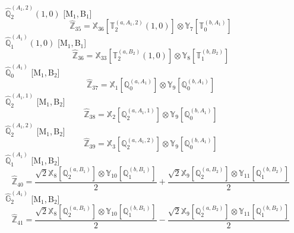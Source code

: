 \documentclass[fleqn,10pt,landscape]{article}
\begin{document}
\begin{itemize}
\begin{dmath*}
\end{dmath*}
\vspace{4mm}
\noindent {} $\,\,\,\hat{\mathbb{Q}}_{2}^{(A_{1},2)}(1,0)$ [M$_{1}$,\,B$_{1}$]
\begin{dmath*}
\hat{\mathbb{Z}}_{35}=\mathbb{X}_{36}[\mathbb{T}_{2}^{(a,A_{1},2)}(1,0)] \otimes\mathbb{Y}_{7}[\mathbb{T}_{0}^{(b,A_{1})}]
\end{dmath*}
\vspace{4mm}
\noindent {} $\,\,\,\hat{\mathbb{Q}}_{1}^{(A_{1})}(1,0)$ [M$_{1}$,\,B$_{1}$]
\begin{dmath*}
\hat{\mathbb{Z}}_{36}=\mathbb{X}_{33}[\mathbb{T}_{2}^{(a,B_{2})}(1,0)] \otimes\mathbb{Y}_{8}[\mathbb{T}_{1}^{(b,B_{2})}]
\end{dmath*}
\vspace{4mm}
\noindent {} $\,\,\,\hat{\mathbb{Q}}_{0}^{(A_{1})}$ [M$_{1}$,\,B$_{2}$]
\begin{dmath*}
\hat{\mathbb{Z}}_{37}=\mathbb{X}_{1}[\mathbb{Q}_{0}^{(a,A_{1})}] \otimes\mathbb{Y}_{9}[\mathbb{Q}_{0}^{(b,A_{1})}]
\end{dmath*}
\vspace{4mm}
\noindent {} $\,\,\,\hat{\mathbb{Q}}_{2}^{(A_{1},1)}$ [M$_{1}$,\,B$_{2}$]
\begin{dmath*}
\hat{\mathbb{Z}}_{38}=\mathbb{X}_{2}[\mathbb{Q}_{2}^{(a,A_{1},1)}] \otimes\mathbb{Y}_{9}[\mathbb{Q}_{0}^{(b,A_{1})}]
\end{dmath*}
\vspace{4mm}
\noindent {} $\,\,\,\hat{\mathbb{Q}}_{2}^{(A_{1},2)}$ [M$_{1}$,\,B$_{2}$]
\begin{dmath*}
\hat{\mathbb{Z}}_{39}=\mathbb{X}_{3}[\mathbb{Q}_{2}^{(a,A_{1},2)}] \otimes\mathbb{Y}_{9}[\mathbb{Q}_{0}^{(b,A_{1})}]
\end{dmath*}
\vspace{4mm}
\noindent {} $\,\,\,\hat{\mathbb{Q}}_{1}^{(A_{1})}$ [M$_{1}$,\,B$_{2}$]
\begin{dmath*}
\hat{\mathbb{Z}}_{40}=\frac{\sqrt{2} \mathbb{X}_{8}[\mathbb{Q}_{2}^{(a,B_{1})}] \otimes\mathbb{Y}_{10}[\mathbb{Q}_{1}^{(b,B_{1})}]}{2} + \frac{\sqrt{2} \mathbb{X}_{9}[\mathbb{Q}_{2}^{(a,B_{2})}] \otimes\mathbb{Y}_{11}[\mathbb{Q}_{1}^{(b,B_{2})}]}{2}
\end{dmath*}
\vspace{4mm}
\noindent {} $\,\,\,\hat{\mathbb{G}}_{2}^{(A_{1})}$ [M$_{1}$,\,B$_{2}$]
\begin{dmath*}
\hat{\mathbb{Z}}_{41}=\frac{\sqrt{2} \mathbb{X}_{8}[\mathbb{Q}_{2}^{(a,B_{1})}] \otimes\mathbb{Y}_{10}[\mathbb{Q}_{1}^{(b,B_{1})}]}{2} - \frac{\sqrt{2} \mathbb{X}_{9}[\mathbb{Q}_{2}^{(a,B_{2})}] \otimes\mathbb{Y}_{11}[\mathbb{Q}_{1}^{(b,B_{2})}]}{2}

\end{dmath*}
\end{itemize}
\end{document}
